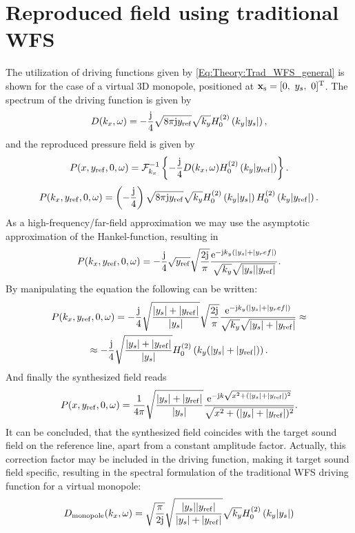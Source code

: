 \section{Reproduced field using traditional WFS}
\label{App: Trad_WFS_rep_field}

The utilization of driving functions given by \eqref{Eq:Theory:Trad_WFS_general} is shown for the case of a virtual 3D monopole, positioned at $\mathbf{x}_{\mathrm{s}} = [0,\ y_s,\ 0]^{\mathrm{T}}$.
The spectrum of the driving function is 
given by
\begin{equation}
D(k_x,\omega) = -\frac{\mathrm{j}}{4}\sqrt{8\pi\mathrm{j} y_{\mathrm{ref}}}\sqrt{k_y} H_0^{(2)} \left( k_y |y_s| \right),
\end{equation}
and the reproduced pressure field is given by
\begin{equation}
P(x,y_{\mathrm{ref}},0,\omega) = \mathcal{F}^{-1}_{k_x} \left\{ -\frac{\mathrm{j}}{4} D(k_x,\omega)  H_0^{(2)} \left( k_y |y_{\mathrm{ref}}| \right) \right\}.
\end{equation}
\begin{equation}
P(k_x,y_{\mathrm{ref}},0,\omega) = \left( -\frac{\mathrm{j}}{4} \right) 
\sqrt{8\pi\mathrm{j} y_{\mathrm{ref}}}\sqrt{k_y} H_0^{(2)} \left( k_y |y_s| \right)H_0^{(2)} \left( k_y |y_{\mathrm{ref}}| \right).
\end{equation}
As a high-frequency/far-field approximation we may use the asymptotic approximation of the Hankel-function, resulting in
\begin{equation}
P(k_x,y_{\mathrm{ref}},0,\omega) = -\frac{\mathrm{j}}{4}
\sqrt{y_{\mathrm{ref}}}\sqrt{\frac{2\mathrm{j} }{\pi}}\frac{\mathrm{e}^{-\mathrm{j} k_y \left( |y_s| + |y_ref| \right) }}{\sqrt{k_y} \sqrt{|y_s| | y_{\mathrm{ref}}|}}.
\end{equation}
By manipulating the equation the following can be written:
\begin{multline}
P(k_x,y_{\mathrm{ref}},0,\omega) = -\frac{\mathrm{j}}{4}
\sqrt{\frac{|y_s| + |y_{\mathrm{ref}}|}{|y_s|}}
\sqrt{\frac{2\mathrm{j} }{\pi}}\frac{\mathrm{e}^{-\mathrm{j} k_y \left( |y_s| + |y_ref| \right) }}{\sqrt{k_y} \sqrt{|y_s| + |y_{\mathrm{ref}}|}}
\approx \\
\approx
 -\frac{\mathrm{j}}{4}
\sqrt{\frac{|y_s| + |y_{\mathrm{ref}}|}{|y_s|}}
H_0^{(2)}\left( k_y (|y_s| + |y_{\mathrm{ref}}|) \right).
\end{multline}
And finally the synthesized field reads
\begin{equation}
P(x,y_{\mathrm{ref}},0,\omega) = 
\frac{1}{4\pi} 
\sqrt{\frac{|y_s| + |y_{\mathrm{ref}}|}{|y_s|}}
\frac{\mathrm{e}^{-\mathrm{j} k \sqrt{x^2 + (|y_s|+|y_{\mathrm{ref}}|)^2} }}{\sqrt{x^2 + (|y_s|+|y_{\mathrm{ref}}|)^2}}.
\end{equation}
It can be concluded, that the synthesized field coincides with the target sound field on the reference line, apart from a constant amplitude factor. Actually, this correction factor may be included in the driving function, making it target sound field specific, resulting in the spectral formulation of the traditional WFS driving function for a virtual monopole:
\begin{equation}
D_{\mathrm{monopole}}(k_x,\omega) = 
\sqrt{\frac{\pi}{2 \mathrm{j}}}
\sqrt{\frac{|y_s| |y_{\mathrm{ref}}|}{|y_s| + |y_{\mathrm{ref}}|}}
\sqrt{k_y} H_0^{(2)} \left( k_y |y_s| \right)
\end{equation}